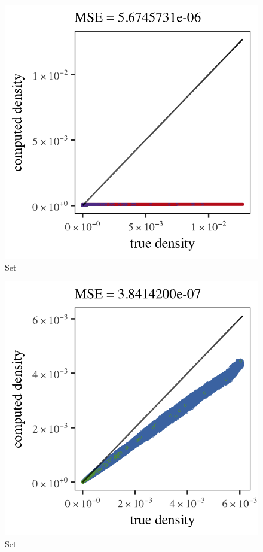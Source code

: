 \begin{subfigure}{0.3\textwidth}
	\centering
	\includegraphics[keepaspectratio=true, width=\textwidth, height=0.23\textheight]{4/img/results_ferdosi_3_1200000_parzen}
	\caption{Set \ferdosiThree}
	\label{fig:4:simulated:datasets:parzen:ferdosi3}
\end{subfigure}	
\begin{subfigure}{0.3\textwidth}
	\centering
	\includegraphics[keepaspectratio=true, width=\textwidth, height=0.23\textheight]{4/img/results_baakman_1_600000_parzen}
	\caption{Set \baakmanOne}
	\label{fig:4:simulated:datasets:parzen:baakman1}
\end{subfigure}
